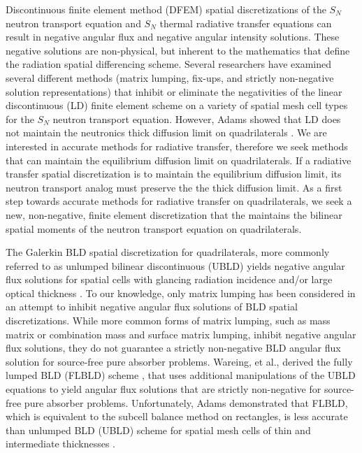 \documentclass{mc2015}
\begin{document}
Discontinuous finite element method (DFEM) spatial discretizations of the $S_N$ neutron transport equation and $S_N$ thermal radiative transfer equations can result in negative angular flux and negative angular intensity solutions.  
These negative solutions are non-physical, but inherent to the mathematics that define the radiation spatial differencing scheme.
Several researchers have examined several different methods (matrix lumping\cite{adams_dfem}, fix-ups\cite{fichtl}, and strictly non-negative solution representations\cite{csz_me}) that inhibit or eliminate the negativities of the linear discontinuous (LD) finite element scheme on  a variety of spatial mesh cell types for the $S_N$ neutron transport equation.
However, Adams showed that LD does not maintain the neutronics thick diffusion limit on quadrilaterals \cite{adams_dfem}.
We are interested in accurate methods for radiative transfer, therefore we seek methods that can maintain the equilibrium diffusion limit on quadrilaterals.
If a radiative transfer spatial discretization is to maintain the equilibrium diffusion limit, its neutron transport analog must preserve the the thick diffusion limit.
As a first step towards accurate methods for radiative transfer on quadrilaterals, we seek a new, non-negative, finite element discretization that the maintains the bilinear spatial moments of the neutron transport equation on quadrilaterals.

The Galerkin BLD spatial discretization for quadrilaterals, more commonly referred to as unlumped bilinear discontinuous (UBLD) yields negative angular flux solutions for spatial cells with glancing radiation incidence and/or large optical thickness \cite{adams_dfem}. 
To our knowledge, only matrix lumping has been considered  in an attempt to inhibit negative angular flux solutions of BLD spatial discretizations.
While more common forms of matrix lumping, such as mass matrix or combination mass and surface matrix lumping, inhibit negative angular flux solutions, they do not guarantee a strictly non-negative BLD angular flux solution  for source-free pure absorber problems\cite{adams_dfem}.
Wareing, et al., derived the fully lumped BLD (FLBLD) scheme \cite{flbld}, that uses additional manipulations of the UBLD equations to yield angular flux solutions that are strictly non-negative for source-free pure absorber problems.
Unfortunately, Adams demonstrated that FLBLD, which is equivalent to the subcell balance method on rectangles, is less accurate than unlumped BLD (UBLD) scheme for spatial mesh cells of thin and intermediate thicknesses \cite{adams_scb}.
\end{document}
